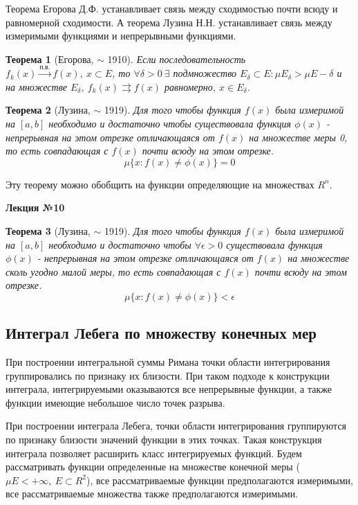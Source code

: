 \documentclass[14pt,a4paper]{extarticle}
\newtheorem{theorem}{Теорема}[section]
\theoremstyle{definition}
\theoremstyle{remark}
\renewcommand{\[}{\begin{dmath*}[compact]}
\renewcommand{\]}{\end{dmath*}}
\newcommand{\ds}{\displaystyle}
\newcommand{\sep}{ , \ \allowbreak }
\begin{document}
Теорема Егорова Д.Ф. устанавливает связь между сходимостью почти всюду и
равномерной сходимости.
А теорема Лузина Н.Н. устанавливает связь между измеримыми функциями и
непрерывными функциями.

\begin{theorem}[Егорова, $\sim$ 1910]
  Если последовательность
  $\ds f_k(x) \xrightarrow{\text{п.в.}} f(x) \sep x \subset E$,
  то $\forall \delta > 0 \ \exists$ подмножество
  $ E_\delta \subset E : \mu E_\delta > \mu E - \delta $ и на множестве
  $E_\delta \sep f_k(x) \rightrightarrows f(x)$ равномерно, $x \in E_\delta$.
\end{theorem}

\begin{theorem}[Лузина, $\sim$ 1919]
  Для того чтобы функция $f(x)$ была измеримой на $[a,b]$
  необходимо и достаточно чтобы существовала функция $\phi(x)$ -
  непрерывная на этом отрезке отличающаяся от $f(x)$ на множестве меры 0,
  то есть совпадающая с $f(x)$ почти всюду на этом отрезке.
  \[\mu\{x:f(x) \neq \phi (x)\} = 0\]
\end{theorem}

Эту теорему можно обобщить на функции определяющие на множествах $R^n$.

\textbf{Лекция №10}

\begin{theorem}[Лузина, $\sim$ 1919]
  Для того чтобы функция $f(x)$ была измеримой на $[a,b]$ необходимо и
  достаточно чтобы $\forall \epsilon > 0$ существовала функция $\phi(x)$ -
  непрерывная на этом отрезке отличающаяся от $f(x)$ на множестве
  сколь угодно малой меры, то есть совпадающая с $f(x)$
  почти всюду на этом отрезке.
  \[\mu\{x:f(x) \neq \phi (x)\} < \epsilon\]
\end{theorem}

\subsection{Интеграл Лебега по множеству конечных мер}

При построении интегральной суммы Римана точки области интегрирования
группировались по признаку их близости.
При таком подходе к конструкции интеграла,
интегрируемыми оказываются все непрерывные функции,
а также функции имеющие небольшое число точек разрыва.

При построении интеграла Лебега,
точки области интегрирования группируются по признаку близости
значений функции в этих точках.
Такая конструкция интеграла позволяет расширить класс интегрируемых функций.
Будем рассматривать функции определенные на множестве конечной меры
($\mu E < +\infty \sep E \subset R^2$),
все рассматриваемые функции предполагаются измеримыми,
все рассматриваемые множества также предполагаются измеримыми.
\end{document}
